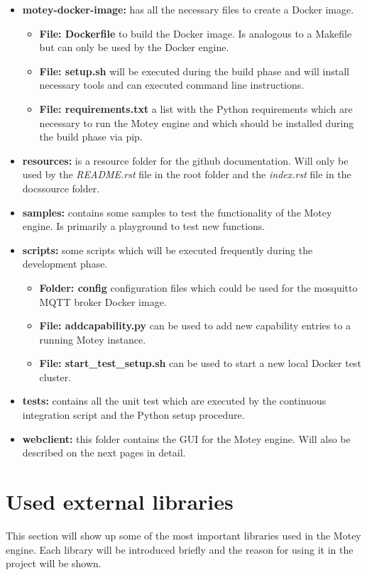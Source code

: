 \begin{itemize}
  \item{\textbf{motey-docker-image:}} has all the necessary files to create a Docker image.
  \begin{itemize}
    \item{\textbf{File: Dockerfile}} to build the Docker image. Is analogous to a Makefile but can only be used by the Docker engine.
    \item{\textbf{File: setup.sh}} will be executed during the build phase and will install necessary tools and can executed command line instructions.
    \item{\textbf{File: requirements.txt}} a list with the Python requirements which are necessary to run the Motey engine and which should be installed during the build phase via pip.
  \end{itemize}
  \item{\textbf{resources:}} is a resource folder for the github documentation. Will only be used by the \textit{README.rst} file in the root folder and the \textit{index.rst} file in the docs\/source folder.
  \item{\textbf{samples:}} contains some samples to test the functionality of the Motey engine. Is primarily a playground to test new functions.
  \item{\textbf{scripts:}} some scripts which will be executed frequently during the development phase.
  \begin{itemize}
    \item{\textbf{Folder: config}} configuration files which could be used for the mosquitto \ac{MQTT} broker Docker image.
    \item{\textbf{File: addcapability.py}} can be used to add new capability entries to a running Motey instance.
    \item{\textbf{File: start\_test\_setup.sh}} can be used to start a new local Docker test cluster.
  \end{itemize}
  \item{\textbf{tests:}} contains all the unit test which are executed by the continuous integration script and the Python setup procedure.
  \item{\textbf{webclient:}} this folder contains the \ac{GUI} for the Motey engine. Will also be described on the next pages in detail.
\end{itemize}

\section{Used external libraries}
This section will show up some of the most important libraries used in the Motey engine.
Each library will be introduced briefly and the reason for using it in the project will be shown.

